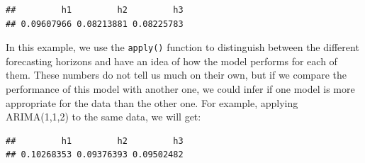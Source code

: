 \documentclass[
]{book}
\newenvironment{Shaded}{\begin{snugshade}}{\end{snugshade}}
\newcommand{\AttributeTok}[1]{\textcolor[rgb]{0.77,0.63,0.00}{#1}}
\newcommand{\ConstantTok}[1]{\textcolor[rgb]{0.00,0.00,0.00}{#1}}
\newcommand{\DecValTok}[1]{\textcolor[rgb]{0.00,0.00,0.81}{#1}}
\newcommand{\FunctionTok}[1]{\textcolor[rgb]{0.00,0.00,0.00}{#1}}
\newcommand{\NormalTok}[1]{#1}
\newcommand{\OtherTok}[1]{\textcolor[rgb]{0.56,0.35,0.01}{#1}}
\newcommand{\SpecialCharTok}[1]{\textcolor[rgb]{0.00,0.00,0.00}{#1}}
\newcommand{\StringTok}[1]{\textcolor[rgb]{0.31,0.60,0.02}{#1}}
\theoremstyle{definition}
\theoremstyle{definition}
\theoremstyle{definition}
\theoremstyle{definition}
\theoremstyle{remark}
\begin{document}
\begin{Shaded}
\end{Shaded}

\begin{verbatim}
##         h1         h2         h3 
## 0.09607966 0.08213881 0.08225783
\end{verbatim}

In this example, we use the \texttt{apply()} function to distinguish between the different forecasting horizons and have an idea of how the model performs for each of them. These numbers do not tell us much on their own, but if we compare the performance of this model with another one, we could infer if one model is more appropriate for the data than the other one. For example, applying ARIMA(1,1,2) to the same data, we will get:

\begin{Shaded}
\end{Shaded}

\begin{verbatim}
##         h1         h2         h3 
## 0.10268353 0.09376393 0.09502482
\end{verbatim}
\end{document}

